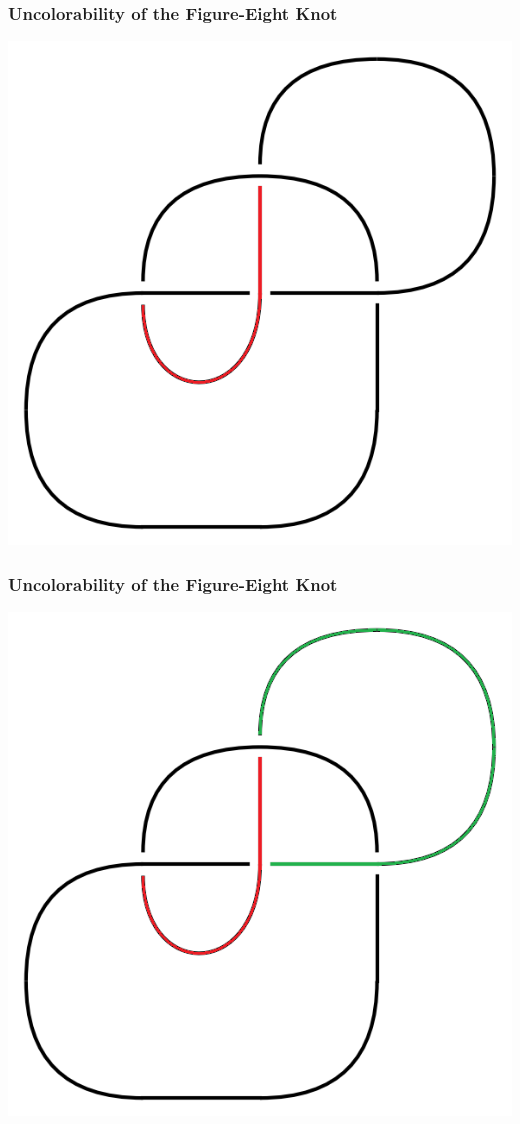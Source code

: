 \documentclass{beamer}
\begin{document}
\begin{frame}
  \frametitle{Uncolorability of the Figure-Eight Knot}
  \begin{center}
    \includegraphics[scale=.4]{figure-eight-bad1}
  \end{center}
\end{frame}

\begin{frame}
  \frametitle{Uncolorability of the Figure-Eight Knot}
  \begin{center}
    \includegraphics[scale=.4]{figure-eight-bad2}
  \end{center}
\end{frame}
\end{document}
